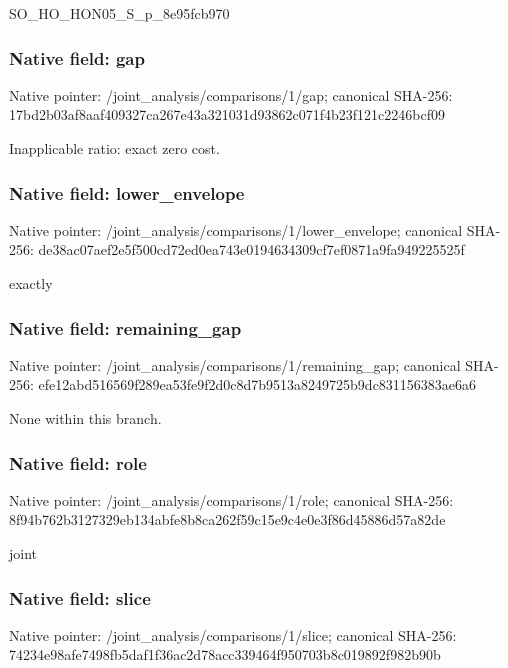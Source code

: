 \documentclass[10pt,a4paper]{article}
\begin{document}
\begingroup\raggedright\sloppy SO\_\allowbreak{}HO\_\allowbreak{}HON05\_\allowbreak{}S\_\allowbreak{}p\_\allowbreak{}8e95fcb970\par\endgroup

\subsubsection{Native field: gap}
Native pointer: /joint\_\allowbreak{}analysis/comparisons/1/gap; canonical SHA-256: 17bd2b03af8aaf409327ca267e43a321031d93862c071f4b23f121c2246bcf09

\begingroup\raggedright\sloppy Inapplicable ratio:\allowbreak{} exact zero cost.\par\endgroup

\subsubsection{Native field: lower\_\allowbreak{}envelope}
Native pointer: /joint\_\allowbreak{}analysis/comparisons/1/lower\_\allowbreak{}envelope; canonical SHA-256: de38ac07aef2e5f500cd72ed0ea743e0194634309cf7ef0871a9fa949225525f

\begingroup\raggedright{} exactly\par\endgroup

\subsubsection{Native field: remaining\_\allowbreak{}gap}
Native pointer: /joint\_\allowbreak{}analysis/comparisons/1/remaining\_\allowbreak{}gap; canonical SHA-256: efe12abd516569f289ea53fe9f2d0c8d7b9513a8249725b9dc831156383ae6a6

\begingroup\raggedright\sloppy None within this branch.\par\endgroup

\subsubsection{Native field: role}
Native pointer: /joint\_\allowbreak{}analysis/comparisons/1/role; canonical SHA-256: 8f94b762b3127329eb134abfe8b8ca262f59c15e9c4e0e3f86d45886d57a82de

\begingroup\raggedright\sloppy joint\par\endgroup

\subsubsection{Native field: slice}
Native pointer: /joint\_\allowbreak{}analysis/comparisons/1/slice; canonical SHA-256: 74234e98afe7498fb5daf1f36ac2d78acc339464f950703b8c019892f982b90b
\end{document}
